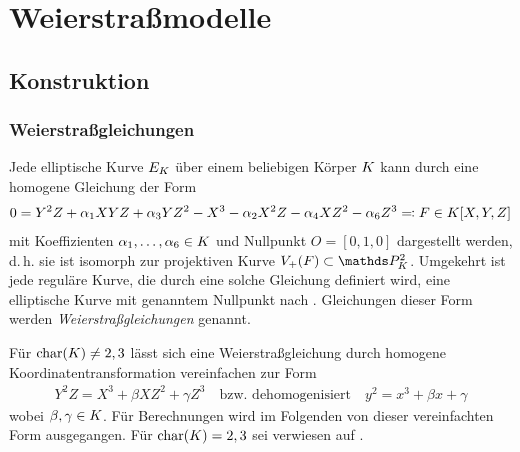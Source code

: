 \documentclass[german]{scrreprt}
\begin{document}




\chapter{Weierstraßmodelle}
\section{Konstruktion}
\subsection{Weierstraßgleichungen}
Jede elliptische Kurve $E_{K}$ über einem beliebigen Körper $K$ kann
durch eine homogene Gleichung der Form
\begin{gather*}
  0 = Y^2 Z + \alpha_1 XYZ + \alpha_3 YZ^2 - X^3 - \alpha_2X^2 Z - \alpha_4 XZ^2 - \alpha_6 Z^3
  \eqqcolon F\in K[X,Y,Z]
\end{gather*}
mit Koeffizienten $\alpha_1,\dotsc,\alpha_6\in K$ und Nullpunkt $O=[0,1,0]$
dargestellt werden, d.\,h. sie ist isomorph zur projektiven Kurve
$V_+(F)\subset\P_\K^2$.
Umgekehrt ist jede reguläre Kurve, die durch eine
solche Gleichung definiert wird, eine elliptische Kurve mit genanntem
Nullpunkt nach \cite[Proposition III.3.1]{silverman}.
Gleichungen dieser Form werden \emph{Weierstraßgleichungen} genannt.

Für $\operatorname{char}(K)\neq 2,3$ lässt sich eine Weierstraßgleichung durch
homogene Koordinatentransformation vereinfachen zur Form
\begin{gather*}
  Y^2 Z = X^3 + \beta XZ^2 + \gamma Z^3
\quad\text{bzw. dehomogenisiert}\quad
  y^2 = x^3 + \beta x + \gamma
\end{gather*}
wobei $\beta,\gamma\in K$.
Für Berechnungen wird im Folgenden von dieser vereinfachten Form
ausgegangen. Für $\operatorname{char}(K)=2,3$ sei verwiesen auf
\cite[Appendix: Elliptic Curves in Characteristics 2 and 3]{silverman}.
\end{document}
